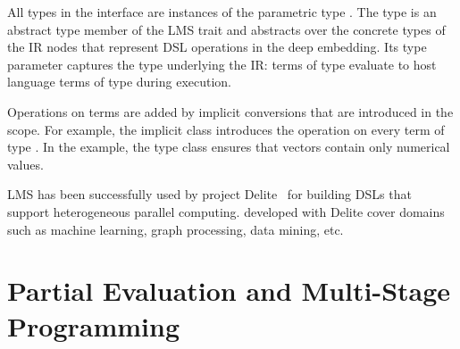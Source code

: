 All types in the  interface are instances of the
parametric type .  The  type is an abstract
type member of the  LMS trait and abstracts over the
concrete types of the IR nodes that represent DSL operations in the
deep embedding.  Its type parameter captures the type underlying the
IR: \edsl terms of type  evaluate to host language terms
of type  during \edsl execution.

Operations on  terms are added by implicit conversions that are introduced in the \edsl scope. For example, the implicit class  introduces the \code{+} operation on every term of type . In the example, the type class  ensures that vectors contain only numerical values.

LMS has been successfully used by project Delite~\cite{brown_heterogeneous_2011,composition-ecoop2013} for building DSLs that support heterogeneous parallel computing. \edsls developed with Delite cover domains
such as machine learning, graph processing, data mining, etc.

\section{Partial Evaluation and Multi-Stage Programming}
\label{sec:partial-evaluation}
